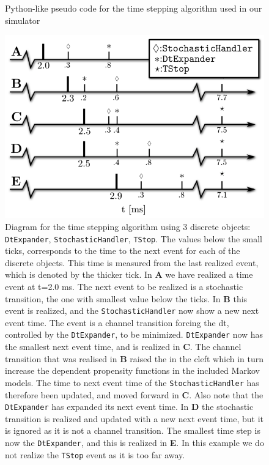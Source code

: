 \label{sec:solution}
\begin{figure}
  \centering
  \vspace{-1.5em}
  \caption{Python-like pseudo code for the time stepping algorithm used in our simulator}
  \label{fig:time-stepping-algorithm}
\end{figure}

\begin{figure}
  \centering
  \includegraphics[width=0.6\linewidth]{chapters/hake/eps/timeline}
  \caption{Diagram for the time stepping algorithm using 3 discrete objects: \texttt{DtExpander}, \texttt{StochasticHandler}, \texttt{TStop}. The values below the small ticks, corresponds to the time to the next event for each of the discrete objects. This time is measured from the last realized event, which is denoted by the thicker tick. In \textbf{A} we have realized a time event at t=2.0 ms. The next event to be realized is a stochastic transition, the one with smallest value below the ticks. In \textbf{B} this event is realized, and the \texttt{StochasticHandler} now show a new next event time. The event is a channel transition forcing the dt, controlled by the \texttt{DtExpander}, to be minimized. \texttt{DtExpander} now has the smallest next event time, and is realized in \textbf{C}. The channel transition that was realised in \textbf{B} raised the \CaC in the cleft which in turn increase the \Ca dependent propensity functions in the included Markov models. The time to next event time of the \texttt{StochasticHandler} has therefore been updated, and moved forward in \textbf{C}. Also note that the \texttt{DtExpander} has expanded its next event time. In \textbf{D} the stochastic transition is realized and updated with a new next event time, but it is ignored as it is not a channel transition. The smallest time step is now the \texttt{DtExpander}, and this is realized in \textbf{E}. In this example we do not realize the \texttt{TStop} event as it is too far away.}
  \label{fig:time-line}
\end{figure}

